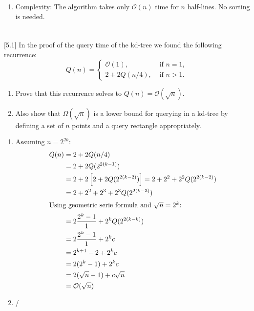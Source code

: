 \documentclass[11pt]{article}
\newenvironment{Quest}{ \begin{framed}} {\end{framed}  \vspace{0.2 cm}}
\begin{document}
\begin{enumerate}
    \item Complexity:  The algorithm takes only $\mathcal{O}(n)$ time for $n$ half-lines. No sorting is needed.
    
\end{enumerate}


\FloatBarrier
\newpage


















\section{}

\begin{Quest}

[5.1] In the proof of the query time of the kd-tree we found the following recurrence:
$$ Q(n) = \begin{cases} \mathcal{O}(1), & \text{ if } n = 1,\\
2+2 Q(n/4), & \text{ if } n > 1.
\end{cases}$$
\begin{enumerate}
    \item Prove that this recurrence solves to $Q(n) = \mathcal{O}(\sqrt{n})$. 
    \item Also show that $\Omega(\sqrt{n})$ is a lower bound for querying in a kd-tree by defining a set of $n$ points and a query rectangle appropriately.
\end{enumerate}

\end{Quest}

\begin{enumerate}
    \item Assuming $n=2^{2k}$:
    \begin{align*}
        Q(n)&=2 + 2 Q(n/4)\\
        &=2 + 2 Q(2^{2(k-1)})\\
        &=2 + 2 \left[ 2+ 2Q(2^{2(k-2)}) \right]=2 + 2^2 + 2^2 Q(2^{2(k-2)})\\
        &=2 + 2^2 + 2^3+ 2^3 Q(2^{2(k-3)})\\
        \intertext{Using geometric serie formula and $\sqrt{n}=2^{k}$:}
        &=2 \frac{2^k-1}{1} + 2^k Q(2^{2(k-k)})\\
        &=2 \frac{2^k-1}{1} + 2^k c\\
        &=2^{k+1}-2+ 2^kc\\
        &=2(2^{k}-1)+2^k c\\
        &=2(\sqrt{n}-1)+c \sqrt{n}\\
        &=\mathcal{O}(\sqrt{n})
    \end{align*}
    \item /
\end{enumerate}
\end{document}
